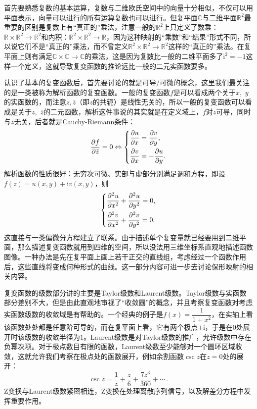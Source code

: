 首先要熟悉复数的基本运算，复数与二维欧氏空间中的向量十分相似，不仅可以用平面表示，向量可以进行的所有运算复数也可以进行。但复平面$\mathbb{C}$与二维平面$\mathbb{R}^2$最重要的区别是复数上有“真正的”乘法，注意一般的$\mathbb{R}^2$上只定义了数乘：$\mathbb{R} \times \mathbb{R}^2 \to \mathbb{R}^2$和内积：$\mathbb{R}^2 \times \mathbb{R}^2 \to \mathbb{R}$，因为这种映射的“乘数”和“结果”形式不同，所以说它们不是“真正的”乘法，而不曾定义$\mathbb{R}^2 \times \mathbb{R}^2 \to \mathbb{R}^2$这样的“真正的”乘法。在复平面上则有满足$\mathbb{C} \times \mathbb{C} \to \mathbb{C}$的乘法，这是因为复数比一般的二维平面多了$\mathrm{i}^2=-1$这样一个定义，这就导致复变函数的推论远比一般的二元实函数要多。

认识了基本的复变函数后，首先要讨论的就是可导/可微的概念，这里我们最关注的是一类被称为解析函数的复变函数。一般的复变函数$f$是可以看成两个关于$x$,~$y$的实函数的，而注意$z,\bar{z}$（即$z$的共轭）是线性无关的，所以一般的复变函数可以看成是关于$z$,~$\bar{z}$的二元函数，解析这件事说的其实就是在定义域上，$f$对$z$可导，同时与$\bar{z}$无关，后者就是Cauchy-Riemann条件：
\[
	\frac{\partial f}{\partial \bar{z}}=0 \Leftrightarrow
	\begin{dcases}
		\dfrac{\partial u}{\partial x}=\dfrac{\partial v}{\partial y},  \\
		\dfrac{\partial v}{\partial x}=-\dfrac{\partial u}{\partial y}. \\
	\end{dcases}
\]
解析函数的性质很好：无穷次可微、实部与虚部分别满足调和方程，即设$f(z)=u(x,y)+\mathrm{i}v(x,y)$，则
\[
	\begin{dcases}
		\dfrac{\partial ^2u}{\partial x^2}+\dfrac{\partial ^2u}{\partial y^2}=0, \\
		\dfrac{\partial ^2v}{\partial x^2}+\dfrac{\partial ^2v}{\partial y^2}=0. \\
	\end{dcases}
\]
这直接与一类偏微分方程建立了联系。由于描述单个复变量就已经要用到二维平面，那么描述复变函数就用到四维的空间，所以没法用三维坐标系直观地描述函数图像。一种办法是先在复平面上画上若干正交的直线组，考虑经过一个函数作用后，这些直线将变成何种形式的曲线。这一部分内容可进一步去讨论保形映射的相关内容。

复变函数的级数部分讲的主要是Taylor级数和Laurent级数。Taylor级数与实函数部分差别不大，但是由此直观地审视了“收敛圆”的概念，并且考察复变函数对考虑实函数级数的收敛域是有帮助的。一个经典的例子是$f(x)=\dfrac{1}{1+x^2}$，在实轴上看该函数处处都是任意阶可导的，而在复平面上看，它有两个极点$\pm\mathrm{i}$，于是在$0$处展开时该级数的收敛半径为$1$。Laurent级数是对Taylor级数的推广，允许级数中存在负幂次项。对于极点数目有限的函数，Laurent级数至少能够对一个圆环区域收敛，这就允许我们考察在极点处的函数展开，例如余割函数$\csc z$在$z=0$处的展开：
\[
	\csc z=\frac{1}{z}+\frac{z}{6}+\frac{7z^3}{360}+\cdots\,.
\]
Z变换与Laurent级数紧密相连，Z变换在处理离散序列信号，以及解差分方程中发挥重要作用。

